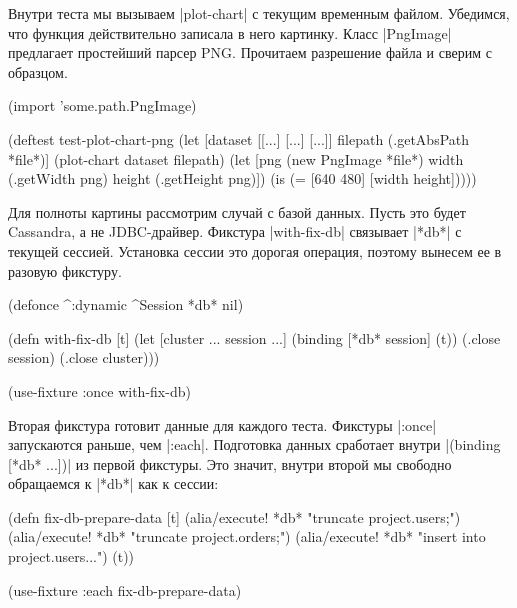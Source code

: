 Внутри теста мы вызываем \spverb|plot-chart| с текущим временным
файлом. Убедимся, что функция действительно записала в него картинку. Класс
\spverb|PngImage| предлагает простейший парсер PNG. Прочитаем разрешение файла и
сверим с образцом.

\begin{english}
  \begin{clojure}
(import 'some.path.PngImage)

(deftest test-plot-chart-png
  (let [dataset [[...] [...] [...]]
        filepath (.getAbsPath *file*)]
    (plot-chart dataset filepath)
    (let [png (new PngImage *file*)
          width (.getWidth png)
          height (.getHeight png)])
    (is (= [640 480] [width height]))))
  \end{clojure}
\end{english}

Для полноты картины рассмотрим случай с базой данных. Пусть это будет Cassandra,
а не JDBC-драйвер. Фикстура \spverb|with-fix-db| связывает \spverb|*db*| с
текущей сессией. Установка сессии это дорогая операция, поэтому вынесем ее в
разовую фикстуру.

\begin{english}
  \begin{clojure}
(defonce ^:dynamic ^Session *db* nil)

(defn with-fix-db [t]
  (let [cluster ...
        session ...]
    (binding [*db* session]
      (t))
    (.close session)
    (.close cluster)))

(use-fixture :once with-fix-db)
  \end{clojure}
\end{english}

Вторая фикстура готовит данные для каждого теста. Фикстуры \spverb|:once|
запускаются раньше, чем \spverb|:each|. Подготовка данных сработает внутри
\spverb|(binding [*db* ...])| из первой фикстуры. Это значит, внутри второй мы
свободно обращаемся к \spverb|*db*| как к сессии:

\begin{english}
  \begin{clojure}
(defn fix-db-prepare-data [t]
  (alia/execute! *db* "truncate project.users;")
  (alia/execute! *db* "truncate project.orders;")
  (alia/execute! *db* "insert into project.users...")
  (t))

(use-fixture :each fix-db-prepare-data)
  \end{clojure}
\end{english}

